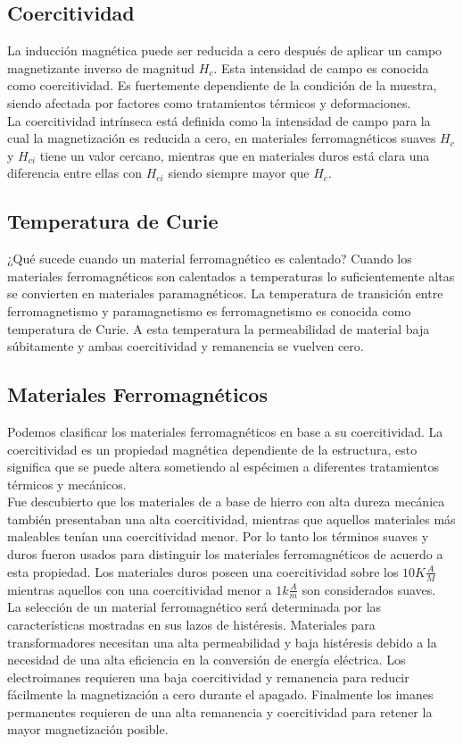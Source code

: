 \subsection{Coercitividad}

La inducción magnética puede ser reducida a cero después de aplicar un campo magnetizante inverso de magnitud $H_c$. Esta intensidad de campo es conocida como coercitividad. Es fuertemente dependiente de la condición de la muestra, siendo afectada por factores como tratamientos térmicos y deformaciones.\\
La coercitividad intrínseca está definida como la intensidad de campo para la cual la magnetización es reducida a cero, en materiales ferromagnéticos suaves $H_c$ y $H_{ci}$ tiene un valor cercano, mientras que en materiales duros está clara una diferencia entre ellas con $H_{ci}$ siendo siempre mayor que $H_c$.

\subsection{Temperatura de Curie}

¿Qué sucede cuando un material ferromagnético es calentado?
Cuando los materiales ferromagnéticos son calentados a temperaturas lo suficientemente altas se convierten en materiales paramagnéticos. La temperatura de transición entre ferromagnetismo y paramagnetismo es ferromagnetismo es conocida como temperatura de Curie. A esta temperatura la permeabilidad de material baja súbitamente y ambas coercitividad y remanencia se vuelven cero.

\subsection{Materiales Ferromagnéticos}

Podemos clasificar los materiales ferromagnéticos en base a su coercitividad. La coercitividad es un propiedad magnética dependiente de la estructura,  esto significa que se puede altera sometiendo al espécimen a diferentes tratamientos térmicos y mecánicos.\\
Fue descubierto que los materiales de a base de hierro con alta dureza mecánica también presentaban una alta coercitividad, mientras que aquellos materiales más maleables tenían una coercitividad menor. Por lo tanto los términos suaves y duros fueron usados para distinguir los materiales ferromagnéticos de acuerdo a esta propiedad. Los materiales duros poseen  una coercitividad sobre los $10K \frac{A}{M}$ mientras aquellos con una coercitividad menor a  $1k \frac{A}{m}$ son considerados suaves.\\
La selección de un material ferromagnético será determinada por las características mostradas en sus lazos de histéresis. Materiales para transformadores necesitan una alta permeabilidad y baja histéresis debido a la necesidad de una alta eficiencia en la conversión de energía eléctrica. Los electroimanes requieren una baja coercitividad y remanencia para reducir fácilmente la magnetización a cero durante el apagado. Finalmente los imanes permanentes requieren de una alta remanencia y coercitividad para retener la mayor magnetización posible. 

